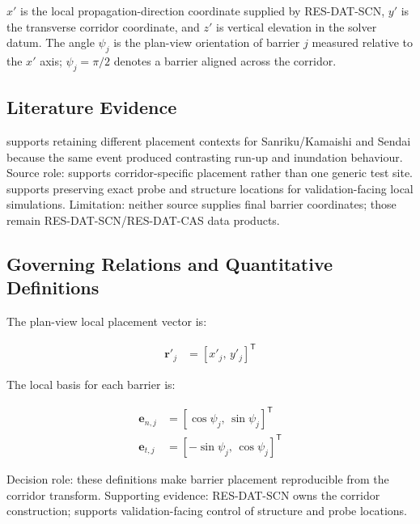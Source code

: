 $x'$ is the local propagation-direction coordinate supplied by
RES-DAT-SCN, $y'$ is the transverse corridor coordinate, and $z'$ is
vertical elevation in the solver datum. The angle $\psi_j$ is the
plan-view orientation of barrier $j$ measured relative to the
$x'$ axis; $\psi_j=\pi/2$ denotes a barrier aligned across the
corridor.

\subsection{Literature Evidence}
\label{sec:res-geo-arr-literature-evidence}

\textcite{mori2012nationwide} supports retaining different placement
contexts for Sanriku/Kamaishi and Sendai because the same event
produced contrasting run-up and inundation behaviour. Source role:
supports corridor-specific placement rather than one generic test
site. \textcite{watanabe2022validation} supports preserving exact
probe and structure locations for validation-facing local simulations.
Limitation: neither source supplies final barrier coordinates; those
remain RES-DAT-SCN/RES-DAT-CAS data products.

\subsection{Governing Relations and Quantitative Definitions}
\label{sec:res-geo-arr-governing-relations}

The plan-view local placement vector is:

\begin{align}
  \mathbf{r}'_j
  &=
  \left[
    x'_j,\,
    y'_j
  \right]^{\mathsf{T}}
  \label{eq:res-geo-arr-placement-vector}
\end{align}

The local basis for each barrier is:

\begin{align}
  \mathbf{e}_{n,j}
  &=
  \left[
    \cos\psi_j,\,
    \sin\psi_j
  \right]^{\mathsf{T}}
  \label{eq:res-geo-arr-barrier-normal}
  \\
  \mathbf{e}_{t,j}
  &=
  \left[
    -\sin\psi_j,\,
    \cos\psi_j
  \right]^{\mathsf{T}}
  \label{eq:res-geo-arr-barrier-tangent}
\end{align}

Decision role: these definitions make barrier placement reproducible
from the corridor transform. Supporting evidence: RES-DAT-SCN owns
the corridor construction; \textcite{watanabe2022validation} supports
validation-facing control of structure and probe locations.

